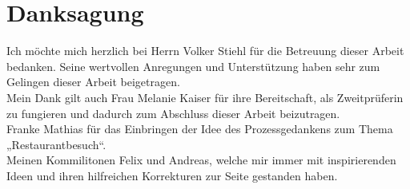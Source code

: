 \section*{Danksagung}
Ich möchte mich herzlich bei Herrn Volker Stiehl für die Betreuung dieser Arbeit  bedanken. Seine wertvollen Anregungen und Unterstützung haben sehr zum Gelingen dieser Arbeit beigetragen. \\

Mein Dank gilt auch Frau Melanie Kaiser für ihre Bereitschaft, als Zweitprüferin zu fungieren und dadurch zum Abschluss dieser Arbeit beizutragen. \\

Franke Mathias für das Einbringen der Idee des Prozessgedankens zum Thema „Restaurantbesuch“. \\

Meinen Kommilitonen Felix und Andreas, welche mir immer mit inspirierenden Ideen und ihren hilfreichen Korrekturen zur Seite gestanden haben. \\
